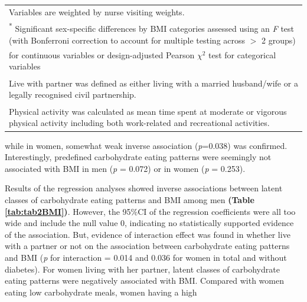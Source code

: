 \begin{table}
\begin{tabular}[t]{lcccccccc}
			\multicolumn{9}{l}{{\scriptsize Variables are weighted by nurse visiting weights.}}\\
			\multicolumn{9}{l}{{\scriptsize \textsuperscript{*} Significant sex-specific differences by BMI categories assessed using an \textit{F} test (with Bonferroni correction to account for multiple testing across $>$ 2 groups)}} \\ 
			\multicolumn{9}{l}{{\scriptsize for continuous variables or design-adjusted Pearson $\chi^2$ test for categorical variables}}\\
			\multicolumn{9}{l}{{\scriptsize \textsuperscript{\ddag} Live with partner was defined as either living with a married husband/wife or a legally recognised civil partnership.}}\\
			\multicolumn{9}{l}{{\scriptsize \textsuperscript{\dag} Physical activity was calculated as mean time spent at moderate or vigorous physical activity including both work-related and recreational activities.}}\\
		\end{tabular}
	
\end{table}


while in women, somewhat weak inverse association (\textit{p}=0.038) was confirmed. Interestingly, predefined carbohydrate eating patterns were seemingly not associated with BMI in men (\textit{p} = 0.072) or in women (\textit{p} = 0.253). 


Results of the regression analyses showed inverse associations between latent classes of carbohydrate eating patterns and BMI among men \textbf{(Table \ref{tab:tab2BMI})}. However, the 95\%CI of the regression coefficients were all too wide and include the null value 0, indicating no statistically supported evidence of the association. But, evidence of interaction effect was found in whether live with a partner or not on the association between carbohydrate eating patterns and BMI (\textit{p} for interaction = 0.014 and 0.036 for women in total and without diabetes). For women living with her partner, latent classes of carbohydrate eating patterns were negatively associated with BMI. Compared with women eating low carbohydrate meals, women having a high


